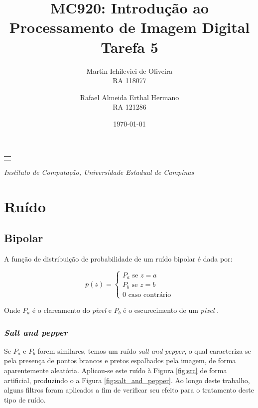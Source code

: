 \documentclass[10pt,a4paper]{article}
\makeatletter
\let\@institution\empty
\def\institution#1{\def\@institution{#1}}
\renewcommand{\maketitle}{
    \begin{center}
        {\Large\bfseries\@title\par\medskip}
        {\large
            \begin{tabular}[t]{c}%
                \@author
        \end{tabular}\par\medskip}
        {\itshape\@institution\par}
        {\itshape\@date\par}
\end{center}}
\newcommand{\pixel}{\textit{pixel} }
\makeatother
\begin{document}

\title{MC920: Introdução ao Processamento de Imagem Digital\\Tarefa 5}
\author{
    \begin{minipage}{6cm}
        \centering
        Martin Ichilevici de Oliveira\\
        RA 118077
    \end{minipage}
    \and
    \begin{minipage}{6cm}
        \centering
        Rafael Almeida Erthal Hermano\\
        RA 121286
    \end{minipage}
}
\institution{Instituto de Computação, Universidade Estadual de Campinas}
\date{\today}

\maketitle


\section{Ruído}
\subsection{Bipolar}
A função de distribuição de probabilidade de um ruído bipolar é dada por:

\begin{equation}
p(z) = \left\{
    \begin{array}{l}
        P_a \text{ se } z = a \\
        P_b \text{ se } z = b \\
        0 \text{ caso contrário}
    \end{array}\right.
\end{equation}

Onde $P_a$ é o clareamento do \pixel e $P_b$ é o escurecimento de um \pixel.

\subsubsection{\textit{Salt and pepper}}
Se $P_a$ e $P_b$ forem similares, temos um ruído \textit{salt and pepper}, o qual caracteriza-se pela presença de pontos brancos e pretos espalhados pela imagem, de forma aparentemente aleatória. Aplicou-se este ruído à Figura \ref{fig:src} de forma artificial, produzindo o a Figura \ref{fig:salt_and_pepper}. Ao longo deste trabalho, alguns filtros foram aplicados a fim de verificar seu efeito para o tratamento deste tipo de ruído.
\end{document}
